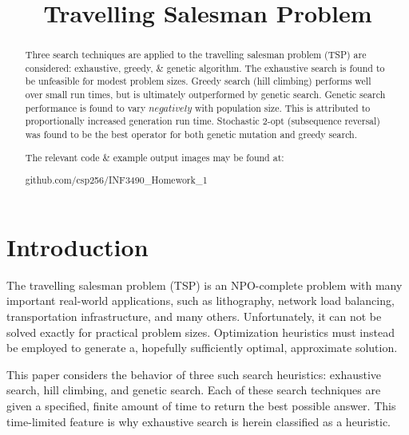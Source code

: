 \documentclass[10pt, conference, compsocconf]{IEEEtran}
\begin{document}
\title{Travelling Salesman Problem}
\author{
}
\maketitle


\begin{abstract}
Three search techniques are applied to the travelling salesman problem (TSP) are considered: exhaustive, greedy, \& genetic algorithm. The exhaustive search is found to be unfeasible for modest problem sizes. Greedy search (hill climbing) performs well over small run times, but is ultimately outperformed by genetic search. Genetic search performance is found to vary $negatively$ with population size. This is attributed to proportionally increased generation run time. Stochastic 2-opt (subsequence reversal) was found to be the best operator for both genetic mutation and greedy search.

The relevant code \& example output images may be found at: 

\centerline{github.com/csp256/INF3490\_Homework\_1}
\end{abstract}

\IEEEpeerreviewmaketitle


\section{Introduction}
The travelling salesman problem (TSP) is an NPO-complete problem with many important real-world applications, such as lithography, network load balancing, transportation infrastructure, and many others. Unfortunately, it can not be solved exactly for practical problem sizes. Optimization heuristics must instead be employed to generate a, hopefully sufficiently optimal, approximate solution.

This paper considers the behavior of three such search heuristics: exhaustive search, hill climbing, and genetic search. Each of these search techniques are given a specified, finite amount of time to return the best possible answer. This time-limited feature is why exhaustive search is herein classified as a heuristic. 
\end{document}
